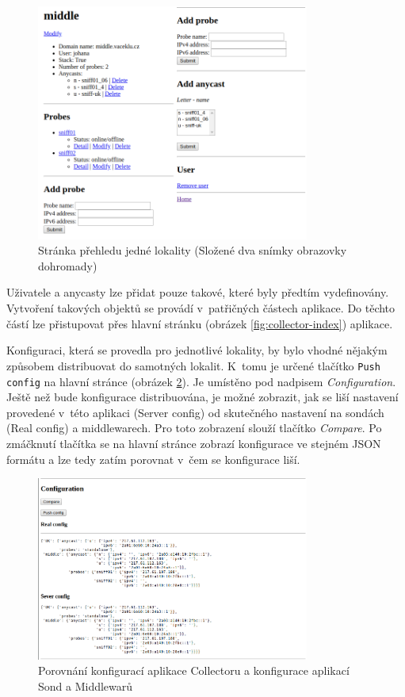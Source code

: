 \documentclass[thesis=M,czech]{src/FITthesis}[2019/12/23]
\begin{document}
\begin{figure}[ht]
  \centering
   \includegraphics[width=0.8\textwidth]{images/collector_location_detail.png}
   \caption{Stránka přehledu jedné lokality (Složené dva snímky obrazovky dohromady)}
     \label{fig:collector_location_detail}
\end{figure}  

Uživatele a anycasty lze přidat pouze takové, které byly předtím vydefinovány. Vytvoření takových objektů se provádí v~patřičných částech aplikace. Do těchto částí lze přistupovat přes hlavní stránku (obrázek \ref{fig:collector-index}) aplikace.

Konfiguraci, která se provedla pro jednotlivé lokality, by bylo vhodné nějakým způsobem distribuovat do samotných lokalit. K~tomu je určené tlačítko \texttt{Push config} na hlavní stránce (obrázek \ref{fig:collector_config}). Je umístěno pod nadpisem \textit{Configuration}. Ještě než bude konfigurace distribuována, je možné zobrazit, jak se liší nastavení provedené v~této aplikaci (Server config) od skutečného nastavení na sondách (Real config) a middlewarech. Pro toto zobrazení slouží tlačítko \textit{Compare}. Po zmáčknutí tlačítka se na hlavní stránce zobrazí konfigurace ve stejném JSON formátu a lze tedy zatím  porovnat v~čem se konfigurace liší. 

\begin{figure}[ht]
  \centering
   \includegraphics[width=0.8\textwidth]{images/collector_config.png}
   \caption{Porovnání konfigurací aplikace Collectoru a konfigurace aplikací Sond a Middlewarů}
     \label{fig:collector_config}
\end{figure}
\end{document}
